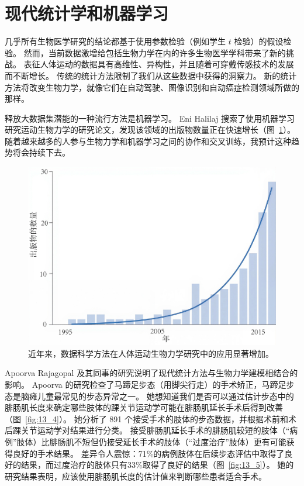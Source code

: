 \section{现代统计学和机器学习}

几乎所有生物医学研究的结论都基于使用参数检验（例如学生 $t$ 检验）的假设检验。
然而，当前数据激增给包括生物力学在内的许多生物医学学科带来了新的挑战。
表征人体运动的数据具有高维性、异构性，并且随着可穿戴传感技术的发展而不断增长。
传统的统计方法限制了我们从这些数据中获得的洞察力。
新的统计方法将改变生物力学，就像它们在自动驾驶、图像识别和自动癌症检测领域所做的那样。


释放大数据集潜能的一种流行方法是机器学习。
Eni Halilaj 搜索了使用机器学习研究运动生物力学的研究论文，发现该领域的出版物数量正在快速增长（图~\ref{fig:13_3}）。
随着越来越多的人参与生物力学和机器学习之间的协作和交叉训练，我预计这种趋势将会持续下去。


\begin{figure}[!htb]
	\centering
	\includegraphics[width=0.75\linewidth]{chap13/13_3}
	\caption{近年来，数据科学方法在人体运动生物力学研究中的应用显著增加\cite{halilaj2018machine}。 \label{fig:13_3}}
\end{figure}


Apoorva Rajagopal 及其同事的研究说明了现代统计方法与生物力学建模相结合的影响。
Apoorva 的研究检查了马蹄足步态（用脚尖行走）的手术矫正，马蹄足步态是脑瘫儿童最常见的步态异常之一。
她想知道我们是否可以通过估计步态中的腓肠肌长度来确定哪些肢体的踝关节运动学可能在腓肠肌延长手术后得到改善（图~\ref{fig:13_4}）。
她分析了 891 个接受手术的肢体的步态数据，并根据术前和术后踝关节运动学对结果进行分类。
接受腓肠肌延长手术的腓肠肌较短的肢体（“病例”肢体）比腓肠肌不短但仍接受延长手术的肢体（“过度治疗”肢体）更有可能获得良好的手术结果。
差异令人震惊：71\%的病例肢体在后续步态评估中取得了良好的结果，而过度治疗的肢体只有33\%取得了良好的结果（图~\ref{fig:13_5}）。
她的研究结果表明，应该使用腓肠肌长度的估计值来判断哪些患者适合手术。

